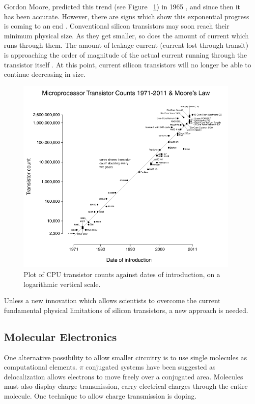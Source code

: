 \documentclass[12pt]{article}
\begin{document}
Gordon Moore, predicted this trend (see Figure ~\ref{fig:MooresLaw}) in 1965 \cite{Moore}, and since then it has been accurate. However, there are signs which show this exponential progress is coming to an end \cite{MooreEnd}. Conventional silicon transistors may soon reach their minimum physical size. As they get smaller, so does the amount of current which runs through them. The amount of leakage current (current lost through transit) is approaching the order of magnitude of the actual current running through the transistor itself \cite{v06}. At this point, current silicon transistors will no longer be able to continue decreasing in size.

\begin{figure}[ht!]
\centering
\includegraphics[width=110mm]{MooresLaw.png}
\caption{Plot of CPU transistor counts against dates of introduction, on a logarithmic vertical scale.}
\label{fig:MooresLaw}
\end{figure}

Unless a new innovation which allows scientists to overcome the current fundamental physical limitations of silicon transistors, a new approach is needed. 

\subsection{Molecular Electronics}

One alternative possibility to allow smaller circuitry is to use single molecules as computational elements. $\pi$ conjugated systems have been suggested as delocalization allows electrons to move freely over a conjugated area. Molecules must also display charge transmission, carry electrical charges through the entire molecule. One technique to allow charge transmission is doping. 
\end{document}
